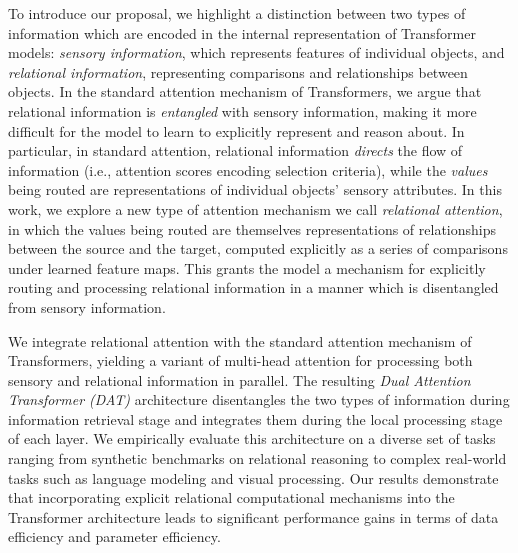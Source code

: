 To introduce our proposal, we highlight a distinction between two types of information which are encoded in the internal representation of Transformer models: \textit{sensory information}, which represents features of individual objects, and \textit{relational information}, representing comparisons and relationships between objects. In the standard attention mechanism of Transformers, we argue that relational information is \textit{entangled} with sensory information, making it more difficult for the model to learn to explicitly represent and reason about. In particular, in standard attention, relational information \textit{directs} the flow of information (i.e., attention scores encoding selection criteria), while the \textit{values} being routed are representations of individual objects' sensory attributes. In this work, we explore a new type of attention mechanism we call \textit{relational attention}, in which the values being routed are themselves representations of relationships between the source and the target, computed explicitly as a series of comparisons under learned feature maps. This grants the model a mechanism for explicitly routing and processing relational information in a manner which is disentangled from sensory information.

We integrate relational attention with the standard attention mechanism of Transformers, yielding a variant of multi-head attention for processing both sensory and relational information in parallel. The resulting \textit{Dual Attention Transformer (DAT)} architecture disentangles the two types of information during information retrieval stage and integrates them during the local processing stage of each layer. We empirically evaluate this architecture on a diverse set of tasks ranging from synthetic benchmarks on relational reasoning to complex real-world tasks such as language modeling and visual processing. Our results demonstrate that incorporating explicit relational computational mechanisms into the Transformer architecture leads to significant performance gains in terms of data efficiency and parameter efficiency.


